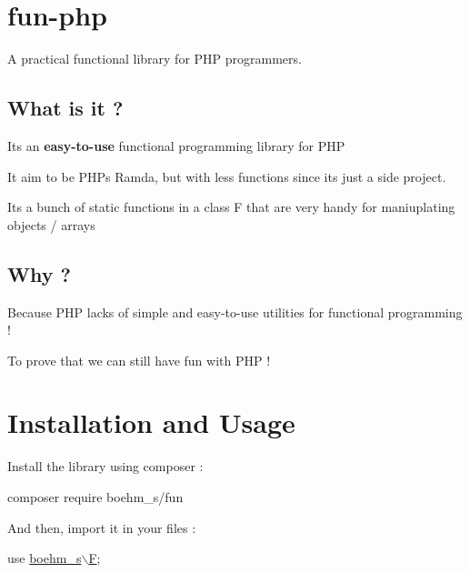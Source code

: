 \section*{fun-\/php}

   

A practical functional library for P\+HP programmers.

\subsection*{What is it ?}


\begin{DoxyItemize}
\item It\textquotesingle{}s an {\bfseries easy-\/to-\/use} functional programming library for P\+HP
\item It aim to be P\+HP\textquotesingle{}s Ramda, but with less functions since it\textquotesingle{}s just a side project.
\item It\textquotesingle{}s a bunch of static functions in a class {\ttfamily F} that are very handy for maniuplating objects / arrays
\end{DoxyItemize}

\subsection*{Why ?}


\begin{DoxyItemize}
\item Because P\+HP lacks of simple and easy-\/to-\/use utilities for functional programming !
\item To prove that we can still have fun with P\+HP !
\end{DoxyItemize}

\section*{Installation and Usage}

Install the library using composer \+:


\begin{DoxyCode}
composer require boehm\_s/fun
\end{DoxyCode}


And then, import it in your files \+:


\begin{DoxyCode}
use \hyperlink{classboehm__s_1_1F}{boehm\_s\(\backslash\)F};
\end{DoxyCode}


